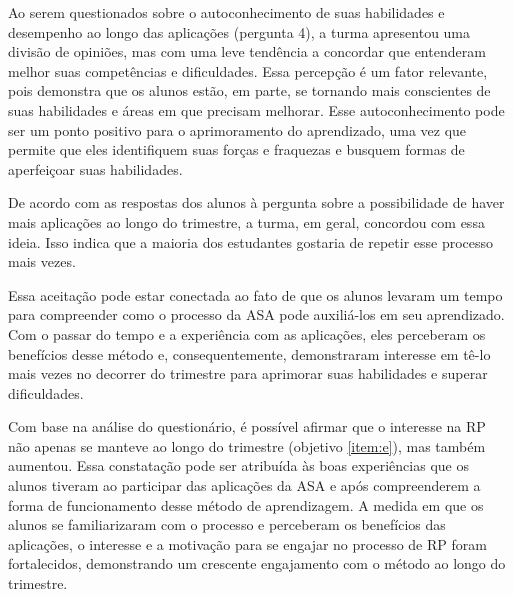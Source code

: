 Ao serem questionados sobre o autoconhecimento de suas habilidades e desempenho ao longo das aplicações (pergunta 4), a turma apresentou uma divisão de opiniões, mas com uma leve tendência a concordar que entenderam melhor suas competências e dificuldades. Essa percepção é um fator relevante, pois demonstra que os alunos estão, em parte, se tornando mais conscientes de suas habilidades e áreas em que precisam melhorar. Esse autoconhecimento pode ser um ponto positivo para o aprimoramento do aprendizado, uma vez que permite que eles identifiquem suas forças e fraquezas e busquem formas de aperfeiçoar suas habilidades.


De acordo com as respostas dos alunos à pergunta sobre a possibilidade de haver mais aplicações ao longo do trimestre, a turma, em geral, concordou com essa ideia. Isso indica que a maioria dos estudantes gostaria de repetir esse processo mais vezes. 

Essa aceitação pode estar conectada ao fato de que os alunos levaram um tempo para compreender como o processo da ASA pode auxiliá-los em seu aprendizado. Com o passar do tempo e a experiência com as aplicações, eles perceberam os benefícios desse método e, consequentemente, demonstraram interesse em tê-lo mais vezes no decorrer do trimestre para aprimorar suas habilidades e superar dificuldades.

Com base na análise do questionário, é possível afirmar que o interesse na RP não apenas se manteve ao longo do trimestre (objetivo \ref{item:e}), mas também aumentou. Essa constatação pode ser atribuída às boas experiências que os alunos tiveram ao participar das aplicações da ASA e após compreenderem a forma de funcionamento desse método de aprendizagem. A medida em que os alunos se familiarizaram com o processo e perceberam os benefícios das aplicações, o interesse e a motivação para se engajar no processo de RP foram fortalecidos, demonstrando um crescente engajamento com o método ao longo do trimestre.
